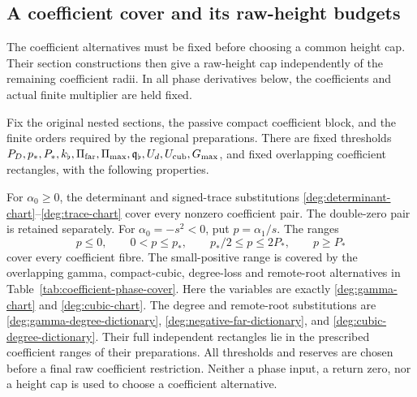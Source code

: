 \subsection{A coefficient cover and its raw-height budgets}
\label{sec:coefficient-raw-budgets}

The coefficient alternatives must be fixed before choosing a common
height cap. Their section constructions then give a raw-height cap
independently of the remaining coefficient radii. In all phase
derivatives below, the coefficients and actual finite multiplier are
held fixed.

\begin{lemma}\label{lem:pure-coefficient-cover}
Fix the original nested sections, the passive compact coefficient block,
and the finite orders required by the regional preparations. There are
fixed thresholds
\(P_D,p_*,P_*,k_\flat,\Pi_{\rm far},\Pi_{\max},
\mathfrak q_\flat,U_d,U_{\rm cub},G_{\max}\), and fixed overlapping
coefficient rectangles, with the following properties.

For \(\alpha_0\ge0\), the determinant and signed-trace substitutions
\eqref{deg:determinant-chart}--\eqref{deg:trace-chart} cover every
nonzero coefficient pair. The double-zero pair is retained separately.
For \(\alpha_0=-s^2<0\), put \(p=\alpha_1/s\). The ranges
\begin{equation}\label{eq:pure-outer-coefficient-cover}
 p\le0,\qquad 0<p\le p_*,\qquad
 p_*/2\le p\le2P_*,\qquad p\ge P_*
\end{equation}
cover every coefficient fibre. The small-positive range is covered by the overlapping gamma,
compact-cubic, degree-loss and remote-root alternatives in
Table~\ref{tab:coefficient-phase-cover}.
Here the variables are exactly \eqref{deg:gamma-chart} and
\eqref{deg:cubic-chart}. The degree and remote-root substitutions are
\eqref{deg:gamma-degree-dictionary},
\eqref{deg:negative-far-dictionary}, and
\eqref{deg:cubic-degree-dictionary}. Their full independent rectangles
lie in the prescribed coefficient ranges of their preparations.
All thresholds and reserves are chosen before a final raw coefficient
restriction. Neither a phase input, a return zero, nor a height cap is
used to choose a coefficient alternative.
\end{lemma}

